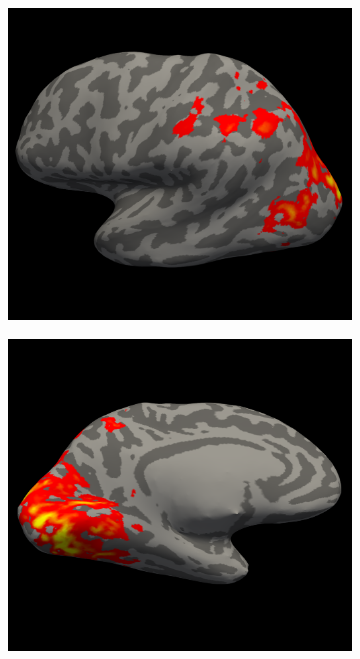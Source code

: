 \documentclass[5p,authoryear]{elsarticle}
\begin{document}
\begin{figure}
\begin{subfigure}{0.2\textwidth}
\caption{}
\label{fig:s1-lh-medial-sensitivity}
\end{subfigure}
\begin{subfigure}{0.2\textwidth}
\centering
\includegraphics[width=\textwidth]{figures/s1-lh-lateral-zscore}
\caption{}
\label{fig:s1-lh-lateral-zscore}
\end{subfigure}
\begin{subfigure}{0.2\textwidth}
\centering
\includegraphics[width=\textwidth]{figures/s1-lh-medial-zscore}

\end{subfigure}
\end{figure}
\end{document}
